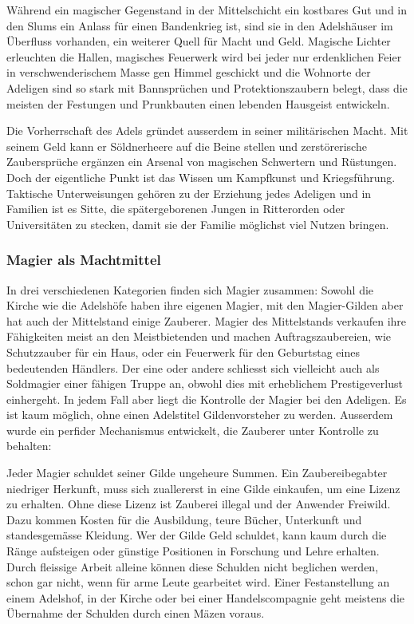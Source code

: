 \documentclass[10pt,twoside,twocolumn,openany]{book}
\begin{document}
Während ein magischer Gegenstand in der Mittelschicht ein kostbares Gut und in den Slums ein Anlass für einen Bandenkrieg ist, sind sie in den Adelshäuser im Überfluss vorhanden, ein weiterer Quell für Macht und Geld.
Magische Lichter erleuchten die Hallen, magisches Feuerwerk wird bei jeder nur erdenklichen Feier in verschwenderischem Masse gen Himmel geschickt und die Wohnorte der Adeligen sind so stark mit Bannsprüchen und Protektionszaubern belegt, dass die meisten der Festungen und Prunkbauten einen lebenden Hausgeist entwickeln.

Die Vorherrschaft des Adels gründet ausserdem in seiner militärischen Macht. Mit seinem Geld kann er Söldnerheere auf die Beine stellen und zerstörerische Zaubersprüche ergänzen ein Arsenal von magischen Schwertern und Rüstungen. Doch der eigentliche Punkt ist das Wissen um Kampfkunst und Kriegsführung. Taktische Unterweisungen gehören zu der Erziehung jedes Adeligen und in Familien ist es Sitte, die spätergeborenen Jungen in Ritterorden oder Universitäten zu stecken, damit sie der Familie möglichst viel Nutzen bringen.

\subsubsection{Magier als Machtmittel}
In drei verschiedenen Kategorien finden sich Magier zusammen: Sowohl die Kirche wie die Adelshöfe haben ihre eigenen Magier, mit den Magier-Gilden aber hat auch der Mittelstand einige Zauberer. Magier des Mittelstands verkaufen ihre Fähigkeiten meist an den Meistbietenden und machen Auftragszaubereien, wie Schutzzauber für ein Haus, oder ein Feuerwerk für den Geburtstag eines bedeutenden Händlers. Der eine oder andere schliesst sich vielleicht auch als Soldmagier einer fähigen Truppe an, obwohl dies mit erheblichem Prestigeverlust einhergeht. In jedem Fall aber liegt die Kontrolle der Magier bei den Adeligen. Es ist kaum möglich, ohne einen Adelstitel Gildenvorsteher zu werden. Ausserdem wurde ein perfider Mechanismus entwickelt, die Zauberer unter Kontrolle zu behalten:

Jeder Magier schuldet seiner Gilde ungeheure Summen. Ein Zaubereibegabter niedriger Herkunft, muss sich zuallererst in eine Gilde einkaufen, um eine Lizenz zu erhalten. Ohne diese Lizenz ist Zauberei illegal und der Anwender Freiwild. Dazu kommen Kosten für die Ausbildung, teure Bücher, Unterkunft und standesgemässe Kleidung. Wer der Gilde Geld schuldet, kann kaum durch die Ränge aufsteigen oder günstige Positionen in Forschung und Lehre erhalten. Durch fleissige Arbeit alleine können diese Schulden nicht beglichen werden, schon gar nicht, wenn für arme Leute gearbeitet wird. Einer Festanstellung an einem Adelshof, in der Kirche oder bei einer Handelscompagnie geht meistens die Übernahme der Schulden durch einen Mäzen voraus.
\end{document}
